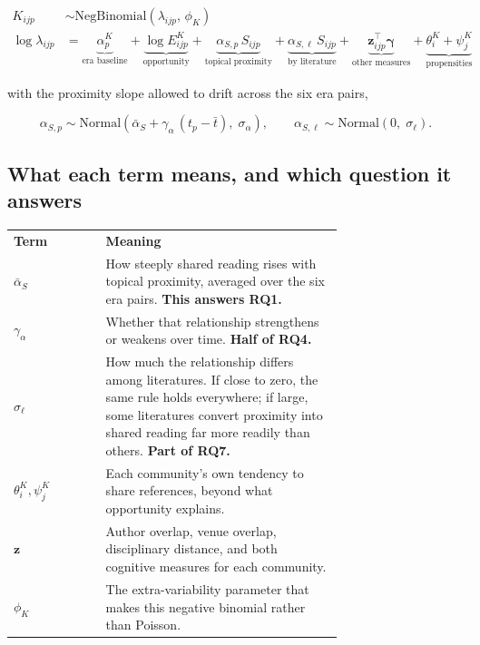 \documentclass[11pt]{article}
\newcommand{\doublerule}{%
  \specialrule{\lightrulewidth}{0pt}{\doublerulesep}%
  \specialrule{\lightrulewidth}{0pt}{0pt}}
\begin{document}
\begin{align}
K_{ijp} &\sim \mathrm{NegBinomial}\!\left(\lambda_{ijp},\, \phi_K\right)\\[2pt]
\log \lambda_{ijp} &= \underbrace{\alpha^{K}_{p}}_{\text{era baseline}}
  + \underbrace{\log E^{K}_{ijp}}_{\text{opportunity}}
  + \underbrace{\alpha_{S,p}\, S_{ijp}}_{\text{topical proximity}}
  + \underbrace{\alpha_{S,\ell}\, S_{ijp}}_{\text{by literature}}
  + \underbrace{\boldsymbol{z}_{ijp}^{\top}\boldsymbol{\gamma}}_{\text{other measures}}
  + \underbrace{\theta^{K}_{i} + \psi^{K}_{j}}_{\text{propensities}}
\end{align}

with the proximity slope allowed to drift across the six era pairs,

\begin{equation}
\alpha_{S,p} \sim \mathrm{Normal}\!\left(\bar{\alpha}_S + \gamma_\alpha\,(t_p - \bar{t}),\;
\sigma_\alpha\right),
\qquad
\alpha_{S,\ell} \sim \mathrm{Normal}\!\left(0,\; \sigma_\ell\right).
\end{equation}

\subsection{What each term means, and which question it answers}

\begin{center}
\small
\begin{tabular}{@{}lp{0.72\linewidth}@{}}
\toprule
\textbf{Term} & \textbf{Meaning}\\
\doublerule
$\bar{\alpha}_S$ & How steeply shared reading rises with topical proximity, averaged over
the six era pairs. \textbf{This answers RQ1.}\\[3pt]
$\gamma_\alpha$ & Whether that relationship strengthens or weakens over time.
\textbf{Half of RQ4.}\\[3pt]
$\sigma_\ell$ & How much the relationship differs among literatures. If close to zero, the
same rule holds everywhere; if large, some literatures convert proximity into shared
reading far more readily than others. \textbf{Part of RQ7.}\\[3pt]
$\theta^{K}_{i},\psi^{K}_{j}$ & Each community's own tendency to share references, beyond
what opportunity explains.\\[3pt]
$\boldsymbol{z}$ & Author overlap, venue overlap, disciplinary distance, and both cognitive
measures for each community.\\[3pt]
$\phi_K$ & The extra-variability parameter that makes this negative binomial rather than
Poisson.\\
\bottomrule
\end{tabular}
\end{center}
\end{document}
